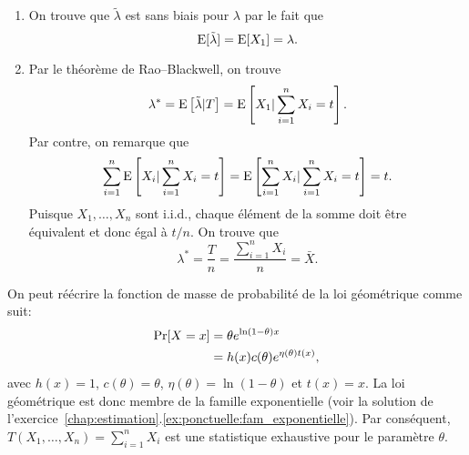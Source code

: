 \begin{solution}{3.14}
\begin{enumerate}
\item On trouve que $\tilde{\lambda}$ est sans biais pour $\lambda$ par le fait que
$$
\operatorname{E}[\tilde{\lambda}] = \operatorname{E}[X_1] = \lambda.
$$

\item Par le théorème de Rao--Blackwell, on trouve
$$
\lambda^\ast = \operatorname{E} \left[ \tilde{\lambda} | T \right] = \operatorname{E} \left[ X_1 | \sum_{i=1}^n X_i = t \right].
$$
Par contre, on remarque que
$$
\sum_{i=1}^n \operatorname{E} \left[ X_i | \sum_{i=1}^n X_i = t \right] = \operatorname{E} \left[\sum_{i=1}^n X_i | \sum_{i=1}^n X_i = t \right] = t.
$$
Puisque $X_1, \dots, X_n$ sont i.i.d., chaque élément de la somme doit être équivalent et donc égal à $t/n$.
On trouve que
$$
\lambda^\ast = \frac{T}{n} = \frac{\sum_{i=1}^n X_i}{n} = \bar{X}.
$$
\end{enumerate}
\end{solution}
\begin{solution}{3.15}
    On peut réécrire la fonction de masse de probabilité de la loi
    géométrique comme suit:
    \begin{align*}
      \mathrm{Pr} [ X = x ] &= \theta e^{\ln(1 - \theta) x} \\
      &= h(x) c(\theta) e^{\eta(\theta) t(x)},
    \end{align*}
    avec $h(x) = 1$, $c(\theta) = \theta$, $\eta(\theta) = \ln (1 -
    \theta)$ et $t(x) = x$. La loi géométrique est donc membre de la
    famille exponentielle (voir la solution de
    l'exercice~\ref{chap:estimation}.\ref{ex:ponctuelle:fam_exponentielle}).
    Par conséquent, $T(X_1, \dots, X_n) = \sum_{i=1}^n X_i$ est une
    statistique exhaustive pour le paramètre $\theta$.
  
\end{solution}
